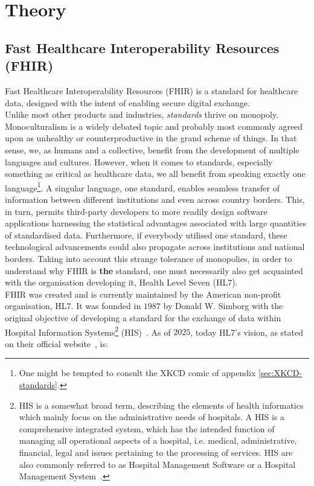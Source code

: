 \section{Theory}\label{sec:theory}
\subsection{Fast Healthcare Interoperability Resources (FHIR)}
Fast Healthcare Interoperability Resources (FHIR) is a standard for healthcare data, designed with the intent of enabling secure digital exchange.
\\
Unlike most other products and industries, \emph{standards} thrive on monopoly. Monoculturalism is a widely debated topic and probably most commonly agreed upon as unhealthy or counterproductive in the grand scheme of things. In that sense, we, as humans and a collective, benefit from the development of multiple languages and cultures. However, when it comes to standards, especially something as critical as healthcare data, we all benefit from speaking exactly one language\footnote{One might be tempted to consult the XKCD comic of appendix \autoref{sec:XKCD-standards}.}. A singular language, one standard, enables seamless transfer of information between different institutions and even across country borders. This, in turn, permits third-party developers to more readily design software applications harnessing the statistical advantages associated with large quantities of standardised data. Furthermore, if everybody utilised one standard, these technological advancements could also propagate across institutions and national borders. Taking into account this strange tolerance of monopolies, in order to understand why FHIR is \textbf{the} standard, one must necessarily also get acquainted with the organisation developing it, Health Level Seven (HL7).
\\
FHIR was created and is currently maintained by the American non-profit organisation, HL7. It was founded in $1987$ by Donald W. Simborg with the original objective of developing a standard for the exchange of data within Hospital Information Systems\footnote{HIS is a somewhat broad term, describing the elements of health informatics which mainly focus on the administrative needs of hospitals. A HIS is a comprehensive integrated system, which has the intended function of managing all operational aspects of a hospital, i.e. medical, administrative, financial, legal and issues pertaining to the processing of services. HIS are also commonly referred to as Hospital Management Software or a Hospital Management System~\cite{Wiki-HIS}.} (HIS)~\cite{Wiki-HL7}. As of $2025$, today HL7's vision, as stated on their official website~\cite{HL7-about}, is:
